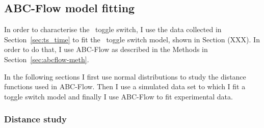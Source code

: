 %














\subsection{ABC-Flow model fitting }

In order to characterise the~\textcite{Litcofsky:2012gr} toggle switch, I use the data collected in Section~\ref{sec:ts_time} to fit the~\textcite{Gardner:2000vha} toggle switch model, shown in Section (XXX). In order to do that, I use ABC-Flow as described in the Methods in Section~\ref{sec:abcflow-meth}.


In the following sections I first use normal distributions to study the distance functions used in ABC-Flow. Then I use a simulated data set to which I fit a toggle switch model and finally I use ABC-Flow to fit experimental data.  

\subsubsection{Distance study}

